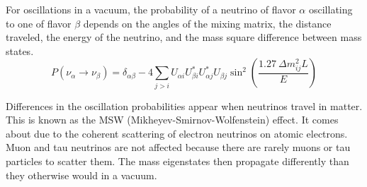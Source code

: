 	For oscillations in a vacuum, the probability of a neutrino of flavor $\alpha$ oscillating to one of flavor $\beta$ depends on the angles of the mixing matrix, the distance traveled, the energy of the neutrino, and the mass square difference between mass states\cite{PDG}.
	\begin{equation}
		P(\nu_\alpha \rightarrow \nu_\beta) = \delta_{\alpha\beta} - 4 \sum_{j>i} U_{\alpha i} U_{\beta i}^* U_{\alpha j}^* U_{\beta j} \sin^2\left(\frac{1.27 \ \Delta m_{ij}^2 L}{E}\right)
	\end{equation}

	Differences in the oscillation probabilities appear when neutrinos travel in matter. This is known as the MSW (Mikheyev-Smirnov-Wolfenstein) effect\cite{mkw}. It comes about due to the coherent scattering of electron neutrinos on atomic electrons. Muon and tau neutrinos are not affected because there are rarely muons or tau particles to scatter them. The mass eigenstates then propagate differently than they otherwise would in a vacuum. 
